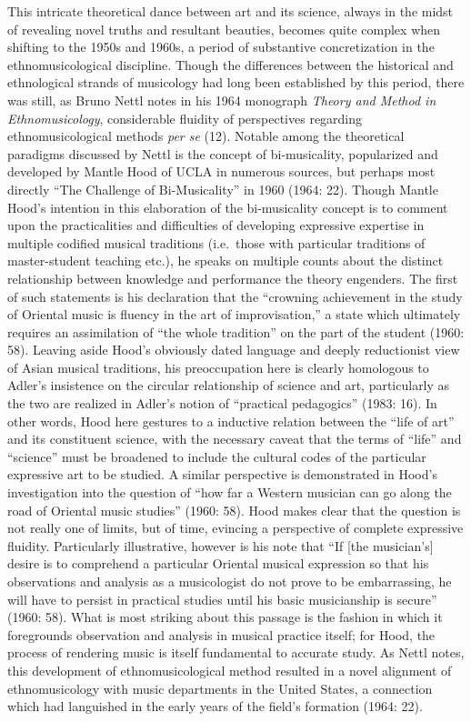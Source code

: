 This intricate theoretical dance between art and its science, always in
the midst of revealing novel truths and resultant beauties, becomes
quite complex when shifting to the 1950s and 1960s, a period of
substantive concretization in the ethnomusicological discipline. Though
the differences between the historical and ethnological strands of
musicology had long been established by this period, there was still, as
Bruno Nettl notes in his 1964 monograph \emph{Theory and Method in
Ethnomusicology}, considerable fluidity of perspectives regarding
ethnomusicological methods \emph{per se} (12). Notable among the
theoretical paradigms discussed by Nettl is the concept of
bi-musicality, popularized and developed by Mantle Hood of UCLA in
numerous sources, but perhaps most directly ``The Challenge of
Bi-Musicality'' in 1960 (1964: 22). Though Mantle Hood's intention in
this elaboration of the bi-musicality concept is to comment upon the
practicalities and difficulties of developing expressive expertise in
multiple codified musical traditions (i.e.~those with particular
traditions of master-student teaching etc.), he speaks on multiple
counts about the distinct relationship between knowledge and performance
the theory engenders. The first of such statements is his declaration
that the ``crowning achievement in the study of Oriental music is
fluency in the art of improvisation,'' a state which ultimately requires
an assimilation of ``the whole tradition'' on the part of the student
(1960: 58). Leaving aside Hood's obviously dated language and deeply
reductionist view of Asian musical traditions, his preoccupation here is
clearly homologous to Adler's insistence on the circular relationship of
science and art, particularly as the two are realized in Adler's notion
of ``practical pedagogics'' (1983: 16). In other words, Hood here
gestures to a inductive relation between the ``life of art'' and its
constituent science, with the necessary caveat that the terms of
``life'' and ``science'' must be broadened to include the cultural codes
of the particular expressive art to be studied. A similar perspective is
demonstrated in Hood's investigation into the question of ``how far a
Western musician can go along the road of Oriental music studies''
(1960: 58). Hood makes clear that the question is not really one of
limits, but of time, evincing a perspective of complete expressive
fluidity. Particularly illustrative, however is his note that ``If
{[}the musician's{]} desire is to comprehend a particular Oriental
musical expression so that his observations and analysis as a
musicologist do not prove to be embarrassing, he will have to persist in
practical studies until his basic musicianship is secure'' (1960: 58).
What is most striking about this passage is the fashion in which it
foregrounds observation and analysis in musical practice itself; for
Hood, the process of rendering music is itself fundamental to accurate
study. As Nettl notes, this development of ethnomusicological method
resulted in a novel alignment of ethnomusicology with music departments
in the United States, a connection which had languished in the early
years of the field's formation (1964: 22).

